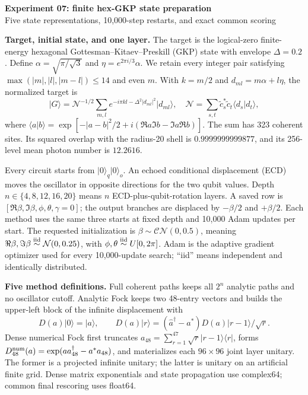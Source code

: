 \documentclass[10pt]{article}
\newcommand{\ket}[1]{\lvert #1\rangle}
\newcommand{\bra}[1]{\langle #1\rvert}
\begin{document}
\begin{center}
{\Large\bfseries Experiment 07: finite hex-GKP state preparation}\\[-1pt]
{\small Five state representations, 10,000-step restarts, and exact common scoring}
\end{center}

\textbf{Target, initial state, and one layer.}
The target is the logical-zero finite-energy hexagonal
Gottesman--Kitaev--Preskill (GKP) state with envelope $\Delta=0.2$. Define
$\alpha=\sqrt{\pi/\sqrt3}$ and
$\eta=e^{2\pi i/3}\alpha$. We retain every integer pair satisfying
$\max(|m|,|l|,|m-l|)\leq14$ and even $m$. With $k=m/2$ and
$d_{ml}=m\alpha+l\eta$, the normalized target is
\[
 \ket G=\mathcal N^{-1/2}\sum_{m,l}
 e^{-i\pi kl-\Delta^2|d_{ml}|^2}\ket{d_{ml}},\quad
 \mathcal N=\sum_{s,t}\widetilde c_s^*\widetilde c_t\langle d_s|d_t\rangle,
\]
where
$\langle a|b\rangle=\exp[-|a-b|^2/2+i(\Re a\Im b-\Im a\Re b)]$.
The sum has 323 coherent sites. Its squared overlap with the radius-20 shell is
$0.9999999999877$, and its 256-level mean photon number is $12.2616$.

Every circuit starts from $\ket0_q\ket0_o$. An echoed conditional displacement
(ECD) moves the oscillator in opposite directions for the two qubit values.
Depth $n\in\{4,8,12,16,20\}$ means $n$ ECD-plus-qubit-rotation layers. A saved row
is $[\Re\beta,\Im\beta,\phi,\theta,\gamma=0]$; the output branches are
displaced by $-\beta/2$ and $+\beta/2$. Each method uses the same three starts
at fixed depth and 10,000 Adam updates per start. The requested initialization
is $\beta\sim\mathcal{CN}(0,0.5)$, meaning
$\Re\beta,\Im\beta\stackrel{\rm iid}{\sim}\mathcal N(0,0.25)$, with
$\phi,\theta\stackrel{\rm iid}{\sim}U[0,2\pi]$. Adam is the adaptive gradient
optimizer used for every 10,000-update search; ``iid'' means independent and
identically distributed.

\textbf{Five method definitions.}
Full coherent paths keeps all $2^n$ analytic paths and no oscillator cutoff.
Analytic Fock keeps two 48-entry vectors and builds the upper-left block of the
infinite displacement with
\[
D(a)\ket0=\ket a,\qquad
D(a)\ket r=(\hat a^\dagger-a^*)D(a)\ket{r-1}/\sqrt r.
\]
Dense numerical Fock first truncates
$a_{48}=\sum_{r=1}^{47}\sqrt r\ket{r-1}\!\bra r$, forms
$D_{48}^{\rm num}(a)=\exp(a a_{48}^\dagger-a^*a_{48})$, and materializes each
$96\times96$ joint layer unitary. The former is a projected infinite unitary;
the latter is unitary on an artificial finite grid. Dense matrix exponentials
and state propagation use complex64; common final rescoring uses float64.
\end{document}
